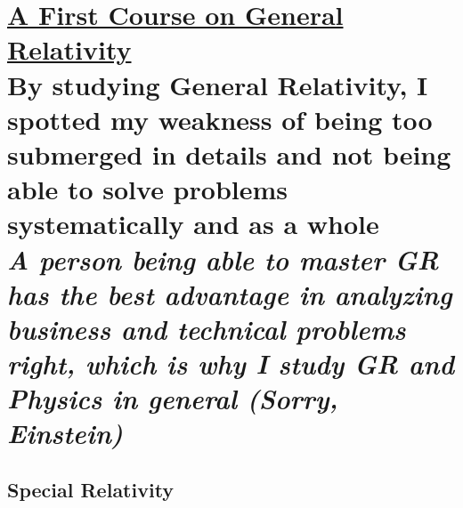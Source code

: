 



    \part{
        \href{https://trello.com/c/jzmmeXHp}{A First Course on General Relativity}
        \\[\bigskipamount]
        \large By studying General Relativity, I spotted my weakness of being too submerged in details and not being able to solve problems systematically and as a whole
        \\[\bigskipamount]
        \large \textit{A person being able to master GR has the best advantage in analyzing business and technical problems right, which is why I study GR and Physics in general (Sorry, Einstein)}
    }

    \chapter{Special Relativity}

    

